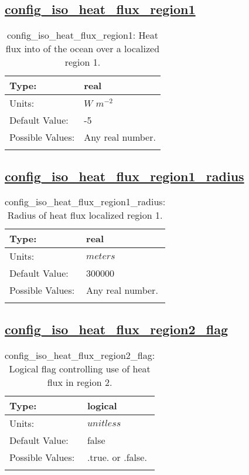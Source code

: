\subsection[config\_iso\_heat\_flux\_region1]{\hyperref[sec:nm_tab_iso]{config\_iso\_heat\_flux\_region1}}
\label{subsec:nm_sec_config_iso_heat_flux_region1}
\begin{center}
\begin{longtable}{| p{2.0in} || p{4.0in} |}
    \hline
    Type: & real \\
    \hline
    Units: & $W$ $m^{-2}$ \\
    \hline
    Default Value: & -5 \\
    \hline
    Possible Values: & Any real number. \\
    \hline
    \caption{config\_iso\_heat\_flux\_region1: Heat flux into of the ocean over a localized region 1.}
\end{longtable}
\end{center}
\subsection[config\_iso\_heat\_flux\_region1\_radius]{\hyperref[sec:nm_tab_iso]{config\_iso\_heat\_flux\_region1\_radius}}
\label{subsec:nm_sec_config_iso_heat_flux_region1_radius}
\begin{center}
\begin{longtable}{| p{2.0in} || p{4.0in} |}
    \hline
    Type: & real \\
    \hline
    Units: & $meters$ \\
    \hline
    Default Value: & 300000 \\
    \hline
    Possible Values: & Any real number. \\
    \hline
    \caption{config\_iso\_heat\_flux\_region1\_radius: Radius of heat flux localized region 1.}
\end{longtable}
\end{center}
\subsection[config\_iso\_heat\_flux\_region2\_flag]{\hyperref[sec:nm_tab_iso]{config\_iso\_heat\_flux\_region2\_flag}}
\label{subsec:nm_sec_config_iso_heat_flux_region2_flag}
\begin{center}
\begin{longtable}{| p{2.0in} || p{4.0in} |}
    \hline
    Type: & logical \\
    \hline
    Units: & $unitless$ \\
    \hline
    Default Value: & false \\
    \hline
    Possible Values: & .true. or .false. \\
    \hline
    \caption{config\_iso\_heat\_flux\_region2\_flag: Logical flag controlling use of heat flux in region 2.}
\end{longtable}
\end{center}
